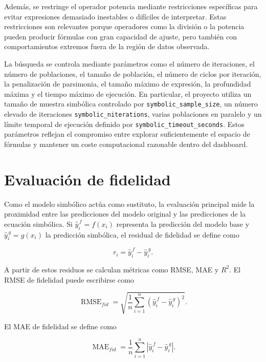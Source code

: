 Además, se restringe el operador potencia mediante restricciones específicas para evitar expresiones demasiado inestables o difíciles de interpretar. Estas restricciones son relevantes porque operadores como la división o la potencia pueden producir fórmulas con gran capacidad de ajuste, pero también con comportamientos extremos fuera de la región de datos observada.

La búsqueda se controla mediante parámetros como el número de iteraciones, el número de poblaciones, el tamaño de población, el número de ciclos por iteración, la penalización de parsimonia, el tamaño máximo de expresión, la profundidad máxima y el tiempo máximo de ejecución. En particular, el proyecto utiliza un tamaño de muestra simbólica controlado por \texttt{symbolic\_sample\_size}, un número elevado de iteraciones \texttt{symbolic\_niterations}, varias poblaciones en paralelo y un límite temporal de ejecución definido por \texttt{symbolic\_timeout\_seconds}. Estos parámetros reflejan el compromiso entre explorar suficientemente el espacio de fórmulas y mantener un coste computacional razonable dentro del dashboard.

\section{Evaluación de fidelidad}

Como el modelo simbólico actúa como sustituto, la evaluación principal mide la proximidad entre las predicciones del modelo original y las predicciones de la ecuación simbólica. Si \(\hat{y}^{\,f}_i = f(x_i)\) representa la predicción del modelo base y \(\hat{y}^{\,g}_i = g(x_i)\) la predicción simbólica, el residual de fidelidad se define como

\begin{equation}
r_i
=
\hat{y}^{\,f}_i
-
\hat{y}^{\,g}_i.
\label{eq:symbolic-residual}
\end{equation}

A partir de estos residuos se calculan métricas como RMSE, MAE y \(R^2\). El RMSE de fidelidad puede escribirse como

\begin{equation}
\operatorname{RMSE}_{fid}
=
\sqrt{
\frac{1}{n}
\sum_{i=1}^{n}
\left(
\hat{y}^{\,f}_i
-
\hat{y}^{\,g}_i
\right)^2
}.
\label{eq:symbolic-rmse-fidelity}
\end{equation}

El MAE de fidelidad se define como

\begin{equation}
\operatorname{MAE}_{fid}
=
\frac{1}{n}
\sum_{i=1}^{n}
\left|
\hat{y}^{\,f}_i
-
\hat{y}^{\,g}_i
\right|.
\label{eq:symbolic-mae-fidelity}
\end{equation}

